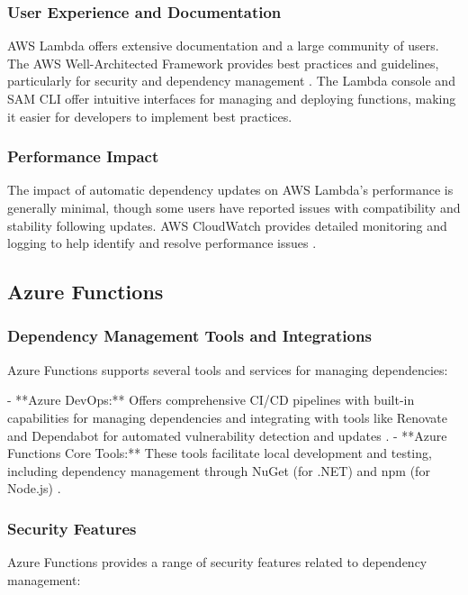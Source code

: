 \documentclass[sigconf]{acmart}
\begin{document}
\subsubsection{User Experience and Documentation}

AWS Lambda offers extensive documentation and a large community of users. The AWS Well-Architected Framework provides best practices and guidelines, particularly for security and dependency management \cite{awsWell2023}. The Lambda console and SAM CLI offer intuitive interfaces for managing and deploying functions, making it easier for developers to implement best practices.

\subsubsection{Performance Impact}

The impact of automatic dependency updates on AWS Lambda's performance is generally minimal, though some users have reported issues with compatibility and stability following updates. AWS CloudWatch provides detailed monitoring and logging to help identify and resolve performance issues \cite{lambdaPerformance2023}.

\subsection{Azure Functions}

\subsubsection{Dependency Management Tools and Integrations}

Azure Functions supports several tools and services for managing dependencies:

- **Azure DevOps:** Offers comprehensive CI/CD pipelines with built-in capabilities for managing dependencies and integrating with tools like Renovate and Dependabot for automated vulnerability detection and updates \cite{azureDevOps2023}.
- **Azure Functions Core Tools:** These tools facilitate local development and testing, including dependency management through NuGet (for .NET) and npm (for Node.js) \cite{azureCoreTools2023}.

\subsubsection{Security Features}

Azure Functions provides a range of security features related to dependency management:
\end{document}
